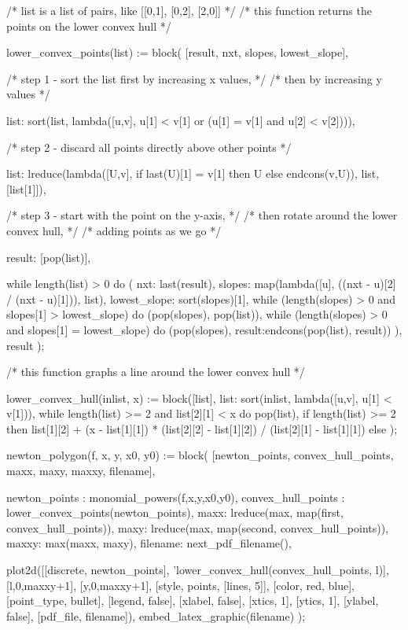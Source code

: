 \begin{maximacommonsmall}
/* list is a list of pairs, like [[0,1], [0,2], [2,0]] */
/* this function returns the points on the lower convex hull */

lower_convex_points(list) := block(
   [result, nxt, slopes, lowest_slope],

   /* step 1 - sort the list first by increasing x values, */
   /*    then by increasing y values */

   list: sort(list, lambda([u,v],
      u[1] < v[1] or (u[1] = v[1] and u[2] < v[2]))),

   /* step 2 - discard all points directly above other points */

   list: lreduce(lambda([U,v],
        if last(U)[1] = v[1] then U else endcons(v,U)),
      list, [list[1]]),

   /* step 3 - start with the point on the y-axis, */
   /*    then rotate around the lower convex hull, */
   /*    adding points as we go */

   result: [pop(list)],

   while length(list) > 0 do (
      nxt: last(result),
      slopes: map(lambda([u],
         ((nxt - u)[2] / (nxt - u)[1])), list),
      lowest_slope: sort(slopes)[1],
      while (length(slopes) > 0 and slopes[1] > lowest_slope) do
         (pop(slopes), pop(list)),
      while (length(slopes) > 0 and slopes[1] = lowest_slope) do
         (pop(slopes), result:endcons(pop(list), result))
   ),
   result
);

/* this function graphs a line around the lower convex hull */

lower_convex_hull(inlist, x) := block([list],
  list: sort(inlist, lambda([u,v], u[1] < v[1])),
  while length(list) >= 2 and list[2][1] < x do pop(list),
  if length(list) >= 2 then
     list[1][2] + (x - list[1][1])
                  * (list[2][2] - list[1][2])
                  / (list[2][1] - list[1][1])
  else
);

newton_polygon(f, x, y, x0, y0) := block(
   [newton_points, convex_hull_points, maxx, maxy, maxxy, filename],

   newton_points : monomial_powers(f,x,y,x0,y0),
   convex_hull_points : lower_convex_points(newton_points),
   maxx: lreduce(max, map(first, convex_hull_points)),
   maxy: lreduce(max, map(second, convex_hull_points)),
   maxxy: max(maxx, maxy),
   filename: next_pdf_filename(),

   plot2d([[discrete, newton_points],
           'lower_convex_hull(convex_hull_points, l)],
       [l,0,maxxy+1], [y,0,maxxy+1],
       [style, points, [lines, 5]],
       [color, red, blue],
       [point_type, bullet],
       [legend, false],
       [xlabel, false],
       [xtics, 1], [ytics, 1],
       [ylabel, false],
       [pdf_file, filename]),
   embed_latex_graphic(filename)
);

\end{maximacommonsmall}

